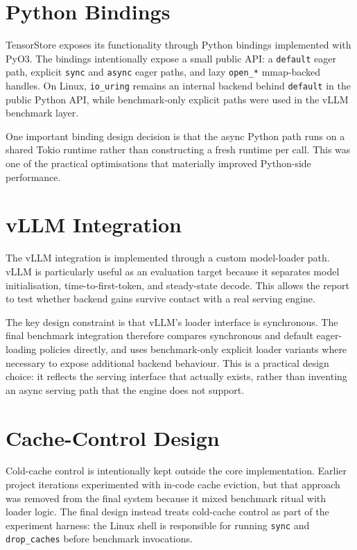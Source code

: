 \section{Python Bindings}

TensorStore exposes its functionality through Python bindings implemented with PyO3. The bindings intentionally expose a small public API: a \texttt{default} eager path, explicit \texttt{sync} and \texttt{async} eager paths, and lazy \texttt{open\_*} mmap-backed handles. On Linux, \texttt{io\_uring} remains an internal backend behind \texttt{default} in the public Python API, while benchmark-only explicit paths were used in the vLLM benchmark layer.

One important binding design decision is that the async Python path runs on a shared Tokio runtime rather than constructing a fresh runtime per call. This was one of the practical optimisations that materially improved Python-side performance.

\section{vLLM Integration}

The vLLM integration is implemented through a custom model-loader path. vLLM is particularly useful as an evaluation target because it separates model initialisation, time-to-first-token, and steady-state decode. This allows the report to test whether backend gains survive contact with a real serving engine.

The key design constraint is that vLLM's loader interface is synchronous. The final benchmark integration therefore compares synchronous and default eager-loading policies directly, and uses benchmark-only explicit loader variants where necessary to expose additional backend behaviour. This is a practical design choice: it reflects the serving interface that actually exists, rather than inventing an async serving path that the engine does not support.

\section{Cache-Control Design}

Cold-cache control is intentionally kept outside the core implementation. Earlier project iterations experimented with in-code cache eviction, but that approach was removed from the final system because it mixed benchmark ritual with loader logic. The final design instead treats cold-cache control as part of the experiment harness: the Linux shell is responsible for running \texttt{sync} and \texttt{drop\_caches} before benchmark invocations.

